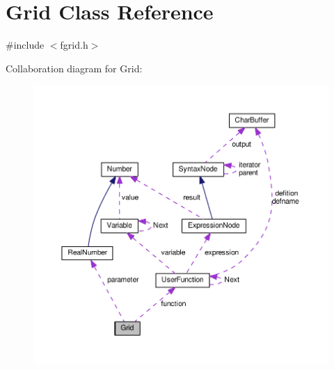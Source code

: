 \hypertarget{classGrid}{}\section{Grid Class Reference}
\label{classGrid}


{\ttfamily \#include $<$fgrid.\+h$>$}



Collaboration diagram for Grid\+:
\nopagebreak
\begin{figure}[H]
\begin{center}
\leavevmode
\includegraphics[width=350pt]{d7/d24/classGrid__coll__graph}
\end{center}
\end{figure}
